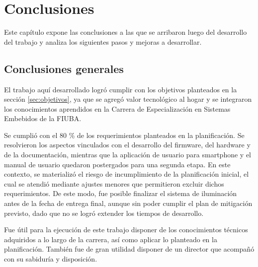 
\chapter{Conclusiones} %

\label{Chapter5} %
Este capítulo expone las conclusiones a las que se arribaron luego del desarrollo del trabajo y analiza los siguientes pasos y mejoras a desarrollar.




\section{Conclusiones generales }

El trabajo aquí desarrollado logró cumplir con los objetivos planteados en la sección \ref{sec:objetivos}, ya que se agregó valor tecnológico al hogar y se integraron los conocimientos aprendidos en la Carrera de Especialización en Sistemas Embebidos de la FIUBA.

Se cumplió con el 80 \% de los requerimientos planteados en la planificación. Se resolvieron los aspectos vinculados con el desarrollo del firmware, del hardware y de la documentación, mientras que la aplicación de usuario para smartphone y el manual de usuario quedaron postergados para una segunda etapa. En este contexto, se materializó el riesgo de incumplimiento de la planificación inicial, el cual se atendió mediante ajustes menores que permitieron excluir dichos requerimientos. De este modo, fue posible finalizar el sistema de iluminación antes de la fecha de entrega final, aunque sin poder cumplir el plan de mitigación previsto, dado que no se logró extender los tiempos de desarrollo.

Fue útil para la ejecución de este trabajo disponer de los conocimientos técnicos adquiridos a lo largo de la carrera, así como aplicar lo planteado en la planificación. También fue de gran utilidad disponer de un director que acompañó con su sabiduría y disposición.

